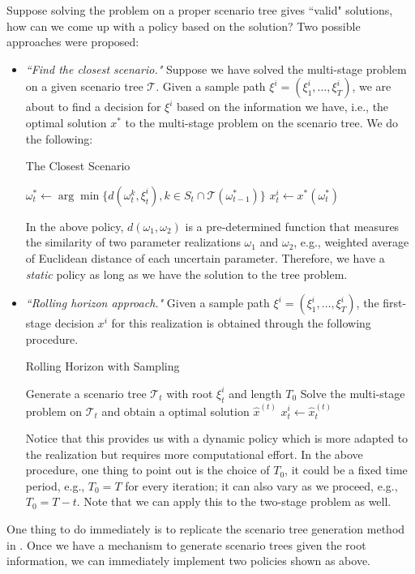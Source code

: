 \documentclass[10pt]{article}
\theoremstyle{plain}
\theoremstyle{definition}
\theoremstyle{remark}
\newcommand{\T}{\mathcal{T}}
\begin{document}
\begin{enumerate}[label=\emph{\alph*})]
Suppose solving the problem on a proper scenario tree gives ``valid" solutions, how can we
come up with a policy based on the solution? Two possible approaches were proposed:
\begin{itemize}
\item {\it``Find the closest scenario."}
Suppose we have solved the multi-stage problem on a given
scenario tree $\T$. Given a sample path $\xi^i = (\xi^i_1, \dots, \xi^i_T)$, we are about to find a decision
for $\xi^i$ based on the information we have, i.e., the optimal solution $x^*$ to the multi-stage problem on the
scenario tree. We do the following:
\begin{algorithm}
\caption{The Closest Scenario}
  \label{alg:cs}
  \begin{algorithmic}
    \STATE $\omega^*_t \gets \arg \min\{d(\omega^k_t, \xi^i_t), k\in S_t\cap \T(\omega_{t-1}^*)\}$
    \STATE $x^i_t \gets x^*(\omega^*_t)$
    \ENDFOR
  \end{algorithmic}
\end{algorithm}
In the above policy, $d(\omega_1,\omega_2)$ is a pre-determined function that measures
the similarity of two parameter realizations $\omega_1$ and $\omega_2$, e.g., weighted average
of Euclidean distance of each uncertain parameter.
Therefore, we have a {\it static} policy as long as we have the solution to the tree problem.
\item {\it``Rolling horizon approach."}
Given a sample path $\xi^i = (\xi^i_1, \dots, \xi^i_T)$, the first-stage decision $x^i$ for this
realization is obtained through the following procedure.
\begin{algorithm}
\caption{Rolling Horizon with Sampling}
  \label{alg:rh}
  \begin{algorithmic}
    \STATE Generate a scenario tree $\T_t$ with root $\xi^i_t$ and length $T_0$
    \STATE Solve the multi-stage problem on $\T_t$ and obtain a optimal solution $\hat{x}^{(t)}$
    \STATE $x^i_t \gets \hat{x}^{(t)}_t$
    \ENDFOR
  \end{algorithmic}
\end{algorithm}
Notice that this provides us with a dynamic policy which is more adapted to the realization but
requires more computational effort. 
In the above procedure, one thing to point out is the choice of $T_0$,
it could be a fixed time period, e.g., $T_0 = T$ for every iteration;
it can also vary as we proceed, e.g., $T_0 = T-t$.
Note that we can apply this to the two-stage problem as well.
\end{itemize}
\end{enumerate}
One thing to do immediately is to replicate the scenario tree generation method in \cite{J2011}.
Once we have a mechanism to generate scenario trees given the root information,
we can immediately implement two policies shown as above.
\end{document}
